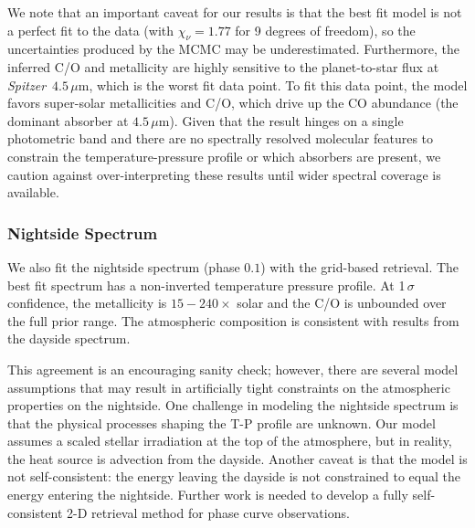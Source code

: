 \documentclass[twocolumn]{aastex61}
\newcommand{\project}[1]{\textsl{#1}}
\newcommand{\Spitzer}{\project{Spitzer}}
\begin{document}
We note that an important caveat for our results is that the best fit model is not a perfect fit to the data (with $\chi_\nu = 1.77$ for 9 degrees of freedom), so the uncertainties produced by the MCMC may be underestimated. Furthermore, the inferred C/O and metallicity are highly sensitive to the planet-to-star flux at \Spitzer\ $4.5\,\mu$m, which is the worst fit data point. To fit this data point, the model favors super-solar metallicities and C/O, which drive up the CO abundance (the dominant absorber at $4.5\,\mu$m). Given that the result hinges on a single photometric band and there are no spectrally resolved molecular features to constrain the temperature-pressure profile or which absorbers are present, we caution against over-interpreting these results until wider spectral coverage is available.


\subsubsection{Nightside Spectrum}
We also fit the nightside spectrum (phase $0.1$) with the grid-based retrieval. The best fit spectrum has a non-inverted temperature pressure profile.  At 1\,$\sigma$ confidence, the metallicity is $15 - 240\times$ solar and the C/O is unbounded over the full prior range. The atmospheric composition is consistent with results from the dayside spectrum. 

This agreement is an encouraging sanity check; however, there are several model assumptions that may result in artificially tight constraints on the atmospheric properties on the nightside.  One challenge in modeling the nightside spectrum is that the physical processes shaping the T-P profile are unknown.  Our model assumes a scaled stellar irradiation at the top of the atmosphere, but in reality, the heat source is advection from the dayside. Another caveat is that the model is not self-consistent: the energy leaving the dayside is not constrained to equal the energy entering the nightside.  Further work is needed to develop a fully self-consistent 2-D retrieval method for phase curve observations. 
\end{document}
